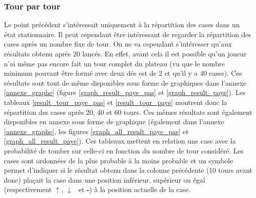 \documentclass[letterpaper]{article}
\newcommand{\caseUp}[1][]{#1\textcolor[HTML]{008000}{$\mathbf{\uparrow}$}}
\newcommand{\caseStable}[1][]{#1\textcolor[HTML]{3779dd}{\textbf{-}}}
\newcommand{\caseDown}[1][]{#1\textcolor[HTML]{dd3737}{$\mathbf{\downarrow}$}}
\begin{document}
    \subsubsection{Tour par tour}
      Le point précédent s'intéressait uniquement à la répartition des cases dans un état
      stationnaire.  Il peut cependant être intéressant de regarder la répartition des cases
      après un nombre fixe de tour.  On ne va cependant s'intéresser qu'aux résultats obtenu
      après 20 lancés.  En effet, avant cela il est possible qu'un joueur n'ai même pas encore
      fait un tour complet du plateau (vu que le nombre minimum pouvant être formé avec deux dés 
      est de 2 et qu'il y a 40 cases).  Ces résultats sont tout de même disponibles sous forme de
      graphiques dans l'annexe \ref{annexe_graphe} (figure \ref{graph_result_paye_pas} et 
      \ref{graph_result_paye}).  Les tableaux \ref{result_tour_paye_pas} et \ref{result_tour_paye} 
      montrent donc la répartition des cases après 20, 40 et 60 tours.  Ces mêmes résultats 
      sont également disponibles en annexe sous forme de graphique (également dans l'annexe
      \ref{annexe_graphe}, les figures \ref{graph_all_result_paye_pas} et \ref{graph_all_result_paye}).  
      Ces tableaux mettent en relation une case avec la probabilité de tomber sur celle-ci en fonction du
      nombre de tour considéré.  Les cases sont ordonnées de la plus probable à la moins probable
      et un symbole permet d'indiquer si le résultat obtenu dans la colonne précédente (10 tours avant donc)
      plaçait la case dans une position inférieur, supérieur ou égal (respectivement \caseUp, \caseDown~ 
      et \caseStable) à la position actuelle de la case.
      
\end{document}
